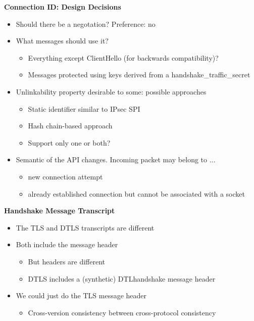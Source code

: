 \documentclass[helvetica]{seminar}
\newcommand{\heading}[1]{%
  \begin{center} 
    \large\bf 
    #1 
  \end{center} 
  \vspace{.4 in}}
\begin{document}
\begin{slide}
\heading{Connection ID: Design Decisions}
\begin{itemize} 

\item Should there be a negotation? Preference: no

\item What messages should use it?  

  \begin{itemize} 
  \item Everything except ClientHello (for backwards compatibility)?
  \item Messages protected using keys derived from a handshake\_traffic\_secret 
  \end{itemize} 

\item Unlinkability property desirable to some: possible approaches

  \begin{itemize} 
  \item Static identifier similar to IPsec SPI
  \item Hash chain-based approach
  \item Support only one or both?  
  \end{itemize} 

\item Semantic of the API changes. Incoming packet may belong to ... 
  \begin{itemize} 
  \item new connection attempt
  \item already established connection but cannot be associated with a socket
  \end{itemize} 
  
\end{itemize} 
\end{slide}

\begin{slide}
\heading{Handshake Message Transcript}

\begin{itemize}
\item The TLS and DTLS transcripts are different
\item Both include the message header
  \begin{itemize}
  \item But headers are different
  \item DTLS includes a (synthetic) DTLhandshake message header
  \end{itemize}
\item We could just do the TLS message header
  \begin{itemize}
  \item Cross-version consistency between cross-protocol consistency
  \end{itemize}
\end{itemize}


\end{slide}
\end{document}
